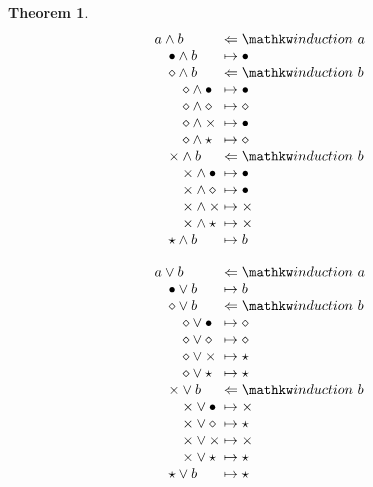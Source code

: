 \documentclass{amsart}
\newtheorem{theorem}{Theorem}[section]
\begin{document}
\begin{theorem}
  \noindent\begin{minipage}{0.5\linewidth}
    \[
      \arraycolsep=1.4pt
      \begin{array}{lcl}
        a \land b &\Leftarrow &\induction a\\
        \quad \bullet\land b &\mapsto &\bullet\\
        \quad \diamond\land b &\Leftarrow &\induction b\\
        \quad\quad \diamond\land\bullet &\mapsto &\bullet\\
        \quad\quad \diamond\land\diamond &\mapsto &\diamond\\
        \quad\quad \diamond\land\times &\mapsto &\bullet\\
        \quad\quad \diamond\land\star &\mapsto &\diamond\\
        \quad \times\land b &\Leftarrow &\induction b\\
        \quad\quad \times\land\bullet &\mapsto &\bullet\\
        \quad\quad \times\land\diamond &\mapsto &\bullet\\
        \quad\quad \times\land\times &\mapsto &\times\\
        \quad\quad \times\land\star &\mapsto &\times\\
        \quad \star\land b &\mapsto &b
      \end{array}
    \]
  \end{minipage}
  \begin{minipage}{0.5\linewidth}
    \[
      \arraycolsep=1.4pt
      \begin{array}{lcl}
        a \lor b &\Leftarrow &\induction a\\
        \quad \bullet\lor b &\mapsto &b\\
        \quad \diamond\lor b &\Leftarrow &\induction b\\
        \quad\quad \diamond\lor\bullet &\mapsto &\diamond\\
        \quad\quad \diamond\lor\diamond &\mapsto &\diamond\\
        \quad\quad \diamond\lor\times &\mapsto &\star\\
        \quad\quad \diamond\lor\star &\mapsto &\star\\
        \quad \times\lor b &\Leftarrow &\induction b\\
        \quad\quad \times\lor\bullet &\mapsto &\times\\
        \quad\quad \times\lor\diamond &\mapsto &\star\\
        \quad\quad \times\lor\times &\mapsto &\times\\
        \quad\quad \times\lor\star &\mapsto &\star\\
        \quad \star\lor b &\mapsto &\star
      \end{array}
    \]
  \end{minipage}
\end{theorem}
\end{document}
